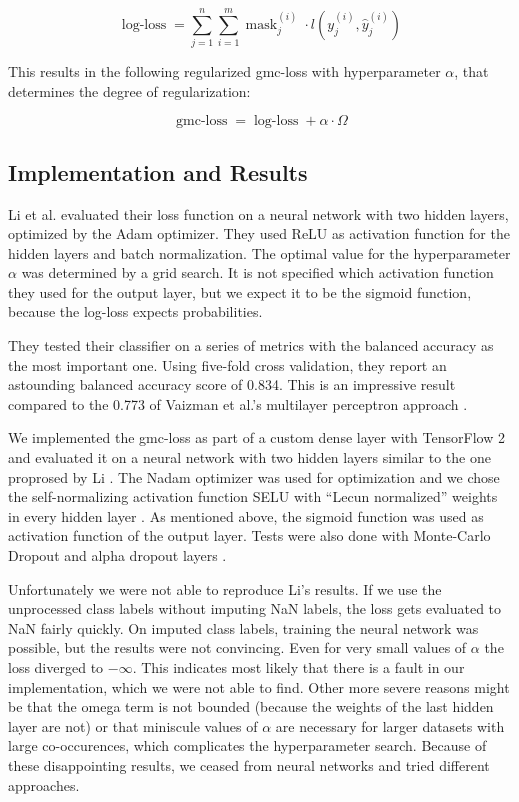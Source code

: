 \begin{equation}
	\operatorname{log-loss} = \sum_{j=1}^{n}\sum_{i=1}^{m} \operatorname{mask}_j^{(i)} \cdot l(y_j^{(i)}, \hat{y}_j^{(i)})
\end{equation}

This results in the following regularized gmc-loss with hyperparameter $\alpha$, that determines the degree of regularization:

\begin{equation}
	\operatorname{gmc-loss} = \operatorname{log-loss} + \alpha \cdot \Omega
\end{equation}

\subsection{Implementation and Results}

Li et al. evaluated their loss function on a neural network with two hidden layers, optimized by the Adam optimizer. They used ReLU as activation function for the hidden layers and batch normalization. The optimal value for the hyperparameter $\alpha$ was determined by a grid search. It is not specified which activation function they used for the output layer, but we expect it to be the sigmoid function, because the log-loss expects probabilities.

They tested their classifier on a series of metrics with the balanced accuracy as the most important one. Using five-fold cross validation, they report an astounding balanced accuracy score of 0.834. This is an impressive result compared to the 0.773 of Vaizman et al.'s multilayer perceptron approach \cite{Vaizman18}.

We implemented the gmc-loss as part of a custom dense layer with TensorFlow 2 and evaluated it on a neural network with two hidden layers similar to the one proprosed by Li \cite{tensorflow2015}. The Nadam optimizer was used for optimization \cite{Dozat2015} and we chose the self-normalizing activation function SELU with \enquote{Lecun normalized} weights in every hidden layer \cite{Klambauer17}. As mentioned above, the sigmoid function was used as activation function of the output layer. Tests were also done with Monte-Carlo Dropout and alpha dropout layers \cite{Gal2016}.

Unfortunately we were not able to reproduce Li's results. If we use the unprocessed class labels without imputing NaN labels, the loss gets evaluated to NaN fairly quickly. On imputed class labels, training the neural network was possible, but the results were not convincing. Even for very small values of $\alpha$ the loss diverged to $-\infty$. This indicates most likely that there is a fault in our implementation, which we were not able to find. Other more severe reasons might be that the omega term is not bounded (because the weights of the last hidden layer are not) or that miniscule values of $\alpha$ are necessary for larger datasets with large co-occurences, which complicates the hyperparameter search.
Because of these disappointing results, we ceased from neural networks and tried different approaches. 